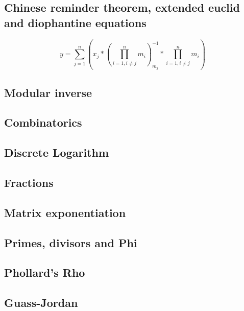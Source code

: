 \subsection{Chinese reminder theorem, extended euclid and diophantine equations}
$$y=\sum_{j=1}^n (x_j*(\prod_{i=1, i\neq j}^n m_i)_{m_j}^{-1}*\prod_{i=1, i\neq j}^n m_i)$$
\newpage

\subsection{Modular inverse}

\subsection{Combinatorics}


\subsection{Discrete Logarithm}


\newpage
\subsection{Fractions}


\subsection{Matrix exponentiation}


\subsection{Primes, divisors and Phi}

\newpage
\subsection{Phollard's Rho}


\newpage
\subsection{Guass-Jordan}

\newpage
